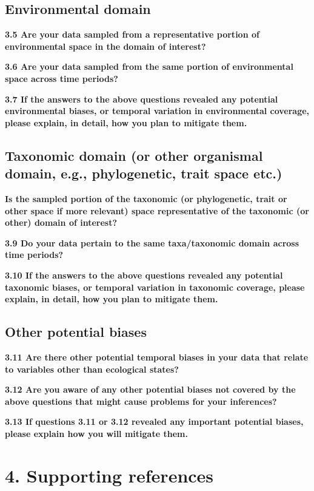 \documentclass[]{article}
\begin{document}
\subsection{Environmental domain}\label{environmental-domain}

\textbf{3.5 Are your data sampled from a representative portion of
environmental space in the domain of interest?}

\textbf{3.6 Are your data sampled from the same portion of environmental
space across time periods?}

\textbf{3.7 If the answers to the above questions revealed any potential
environmental biases, or temporal variation in environmental coverage,
please explain, in detail, how you plan to mitigate them.}

\subsection{Taxonomic domain (or other organismal domain, e.g.,
phylogenetic, trait space
etc.)}\label{taxonomic-domain-or-other-organismal-domain-e.g.-phylogenetic-trait-space-etc.}

\textbf{Is the sampled portion of the taxonomic (or phylogenetic, trait
or other space if more relevant) space representative of the taxonomic
(or other) domain of interest?}

\textbf{3.9 Do your data pertain to the same taxa/taxonomic domain
across time periods?}

\textbf{3.10 If the answers to the above questions revealed any
potential taxonomic biases, or temporal variation in taxonomic coverage,
please explain, in detail, how you plan to mitigate them.}

\subsection{Other potential biases}\label{other-potential-biases}

\textbf{3.11 Are there other potential temporal biases in your data that
relate to variables other than ecological states?}

\textbf{3.12 Are you aware of any other potential biases not covered by
the above questions that might cause problems for your inferences?}

\textbf{3.13 If questions 3.11 or 3.12 revealed any important potential
biases, please explain how you will mitigate them.}

\section{4. Supporting references}\label{supporting-references}
\end{document}
